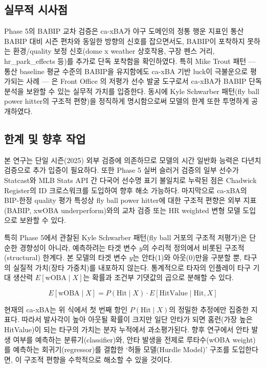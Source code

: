 \documentclass[
  11.5pt,
]{article}
\begin{document}
\subsection{실무적 시사점}\label{uxc2e4uxbb34uxc801-uxc2dcuxc0acuxc810}

Phase 5의 BABIP 교차 검증은 ca-xBA가 야구 도메인의 정통 행운 지표인 통산
BABIP 대비 시즌 편차와 동일한 방향의 신호를 잡으면서도, BABIP이 포착하지
못하는 환경/quality 보정 신호(dome x weather 상호작용, 구장 펜스 거리,
hr\_park\_effects 등)를 추가로 단독 포착함을 확인하였다. 특히 Mike Trout
패턴 --- 통산 baseline 평균 수준의 BABIP을 유지함에도 ca-xBA 기반 luck이
극불운으로 평가되는 사례 --- 은 Front Office 의 저평가 선수 발굴
도구로서 ca-xBA가 BABIP 단독 분석을 보완할 수 있는 실무적 가치를
입증한다. 동시에 Kyle Schwarber 패턴(fly ball power hitter의 구조적
편향)을 정직하게 명시함으로써 모델의 한계 또한 투명하게 공개하였다.

\subsection{한계 및 향후
작업}\label{uxd55cuxacc4-uxbc0f-uxd5a5uxd6c4-uxc791uxc5c5}

본 연구는 단일 시즌(2025) 외부 검증에 의존하므로 모델의 시간 일반화
능력은 다년치 검증으로 추가 입증이 필요하다. 또한 Phase 5 실버 슬러거
검증의 일부 선수가 Statcast와 MLB Stats API 간 다국어 선수명 표기
불일치로 누락된 점은 Chadwick Register의 ID 크로스워크를 도입하여 향후
해소 가능하다. 마지막으로 ca-xBA의 BIP-한정 quality 평가 특성상 fly ball
power hitter에 대한 구조적 편향은 외부 지표(BABIP, xwOBA
underperform)와의 교차 검증 또는 HR weighted 변형 모델 도입으로 보완할
수 있다.

특히 Phase 5에서 관찰된 Kyle Schwarber 패턴(fly ball 거포의 구조적
저평가)은 단순한 경향성이 아니라, 예측하려는 타겟 변수 \(y\)의 수리적
정의에서 비롯된 구조적(structural) 한계다. 본 모델의 타겟 변수 \(y\)는
안타(1)와 아웃(0)만을 구분할 뿐, 타구의 실질적 가치(장타 가중치)를
내포하지 않는다. 통계적으로 타자의 인플레이 타구 기대 생산력
\(E[\mathrm{wOBA} \mid X]\)는 확률과 조건부 기댓값의 곱으로 분해할 수
있다.

\[ E[\mathrm{wOBA} \mid X] = P(\mathrm{Hit} \mid X) \cdot E[\mathrm{HitValue} \mid \mathrm{Hit}, X] \]

현재의 ca-xBA는 위 식에서 첫 번째 항인 \(P(\mathrm{Hit} \mid X)\)의
정밀한 추정에만 집중한 지표다. 따라서 발사각이 높아 아웃될 확률이 크지만
일단 안타가 되면 홈런(가장 높은 HitValue)이 되는 타구의 가치는 분자
누적에서 과소평가된다. 향후 연구에서 안타 발생 여부를 예측하는
분류기(classifier)와, 안타 발생을 전제로 루타수(wOBA weight)를 예측하는
회귀기(regressor)를 결합한 `허들 모델(Hurdle Model)' 구조를 도입한다면,
이 구조적 편향을 수학적으로 해소할 수 있을 것이다.
\end{document}
